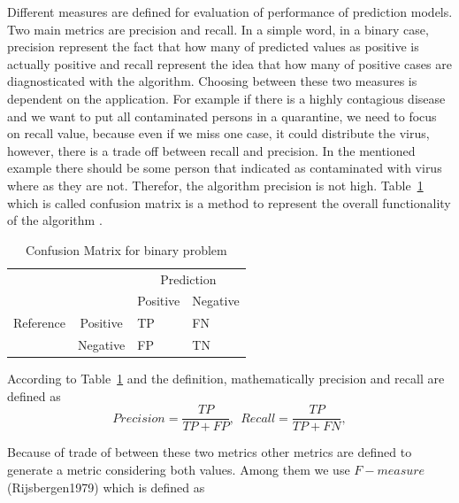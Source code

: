 Different measures are defined for evaluation of performance of prediction models. Two main metrics are precision and recall. In a simple word, in a binary case, precision represent the fact that how many of predicted values as positive is actually positive and recall represent the idea that how many of positive cases are diagnosticated with the algorithm. Choosing between these two measures is dependent on the application. For example if there is a highly contagious disease and we want to put all contaminated persons in a quarantine, we need to focus on recall value, because even if we miss one case, it could distribute the virus, however, there is a trade off between recall and precision. In the mentioned example there should be some person that indicated as contaminated with virus where as they are not. Therefor, the algorithm precision is not high. Table~\ref{tab:confusion_def} which is called confusion matrix is a method to represent the overall functionality of the algorithm \citep{Branco_2015}.  


\begin{table}
\centering
\caption{Confusion Matrix for binary problem}
\label{my-label}
\begin{tabular}{llll}
\hline
                                                 &                              & \multicolumn{2}{c}{Prediction}                              \\ \cline{3-4} 
                                                 &                              & \multicolumn{1}{c}{Positive} & \multicolumn{1}{c}{Negative} \\ \cline{2-4} 
\multicolumn{1}{c}{Reference} & \multicolumn{1}{c}{Positive} & TP                           & FN                           \\
\multicolumn{1}{c}{}                             & \multicolumn{1}{c}{Negative} & FP                           & TN                           \\ \hline
\end{tabular}
\label{tab:confusion_def}
\end{table}

According to Table~\ref{tab:confusion_def} and the definition, mathematically precision and recall are defined as
\begin{equation}
Precision = \frac{TP}{TP+FP}, ~ ~ Recall = \frac{TP}{TP+FN},
\end{equation}

Because of trade of between these two metrics other metrics are defined to generate a metric considering both values. Among them we use $F-measure$ (Rijsbergen1979) which is defined as 

